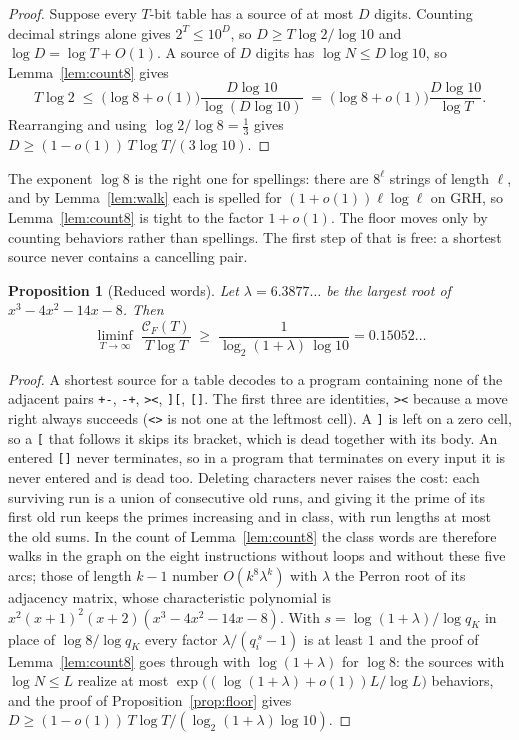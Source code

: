 \documentclass[11pt]{article}
\newtheorem{proposition}[theorem]{Proposition}
\theoremstyle{remark}
\newcommand{\CF}{\mathcal C_F}
\begin{document}
\begin{proof}
Suppose every $T$-bit table has a source of at most $D$ digits.  Counting
decimal strings alone gives $2^T\le10^D$, so $D\ge T\log2/\log10$ and
$\log D=\log T+O(1)$.  A source of $D$ digits has $\log N\le D\log10$, so
Lemma~\ref{lem:count8} gives
\[
  T\log2\;\le\;\bigl(\log8+o(1)\bigr)\frac{D\log10}{\log(D\log10)}
  \;=\;\bigl(\log8+o(1)\bigr)\frac{D\log10}{\log T}.
\]
Rearranging and using $\log2/\log8=\frac13$ gives
$D\ge(1-o(1))\,T\log T/(3\log10)$.
\end{proof}

The exponent $\log8$ is the right one for spellings: there are $8^\ell$
strings of length $\ell$, and by Lemma~\ref{lem:walk} each is spelled for
$(1+o(1))\ell\log\ell$ on GRH, so Lemma~\ref{lem:count8} is tight to the
factor $1+o(1)$.  The floor moves only by counting behaviors rather than
spellings.  The first step of that is free: a shortest source never contains
a cancelling pair.

\begin{proposition}[Reduced words]\label{prop:reduced}
Let $\lambda=6.3877\ldots$ be the largest root of $x^3-4x^2-14x-8$.  Then
\[
  \liminf_{T\to\infty}\;\frac{\CF(T)}{T\log T}
  \;\ge\;\frac{1}{\log_2(1+\lambda)\,\log10}=0.15052\ldots
\]
\end{proposition}

\begin{proof}
A shortest source for a table decodes to a program containing none of the
adjacent pairs \texttt{+-}, \texttt{-+}, \texttt{><}, \texttt{][},
\texttt{[]}.  The first three are identities, \texttt{><} because a move
right always succeeds (\texttt{<>} is not one at the leftmost cell).  A
\texttt{]} is left on a zero cell, so a \texttt{[} that follows it skips
its bracket, which is dead together with its body.  An entered \texttt{[]}
never terminates, so in a program that terminates on every input it is
never entered and is dead too.  Deleting characters never raises the cost:
each surviving run is a union of consecutive old runs, and giving it the
prime of its first old run keeps the primes increasing and in class, with
run lengths at most the old sums.  In the count of Lemma~\ref{lem:count8}
the class words are therefore walks in the graph on the eight instructions
without loops and without these five arcs; those of length $k-1$ number
$O(k^8\lambda^{k})$ with $\lambda$ the Perron root of its adjacency matrix,
whose characteristic polynomial is
$x^2(x+1)^2(x+2)(x^3-4x^2-14x-8)$.  With $s=\log(1+\lambda)/\log q_K$ in
place of $\log8/\log q_K$ every factor $\lambda/(q_i^{\,s}-1)$ is at least
$1$ and the proof of Lemma~\ref{lem:count8} goes through with
$\log(1+\lambda)$ for $\log8$: the sources with $\log N\le L$ realize at
most $\exp\bigl((\log(1+\lambda)+o(1))L/\log L\bigr)$ behaviors, and the
proof of Proposition~\ref{prop:floor} gives
$D\ge(1-o(1))\,T\log T/(\log_2(1+\lambda)\log10)$.
\end{proof}
\end{document}
